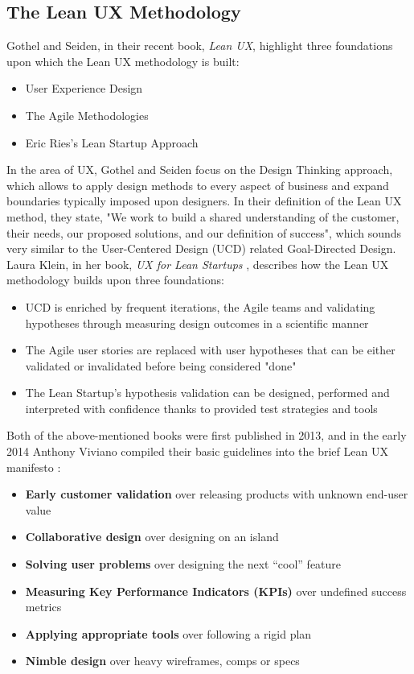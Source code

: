\documentclass{article}
\begin{document}
\subsection{The Lean UX Methodology}
Gothel and Seiden, in their recent book, \textit{Lean UX}, \citep{gothelf2016lean} highlight three foundations upon which the Lean UX methodology is built:
\begin{itemize}
  \item User Experience Design
  \item The Agile Methodologies
  \item Eric Ries's Lean Startup Approach
\end{itemize}
In the area of UX, Gothel and Seiden focus on the Design Thinking approach, which allows to apply design methods to every aspect of business and expand boundaries typically imposed upon designers. In their definition of the Lean UX method, they state, "We work to build a shared understanding of the customer, their needs, our
proposed solutions, and our definition of success", which sounds very similar to the User-Centered Design (UCD) related Goal-Directed Design.
Laura Klein, in her book, \textit{UX for Lean Startups} \citep{klein2013ux}, describes how the Lean UX methodology builds upon three foundations:
\begin{itemize}
  \item UCD is enriched by frequent iterations, the Agile teams and validating hypotheses through measuring design outcomes in a scientific manner
  \item The Agile user stories are replaced with user hypotheses that can be either validated or invalidated before being considered "done"
  \item The Lean Startup's hypothesis validation can be designed, performed and interpreted with confidence thanks to provided test strategies and tools
\end{itemize}
Both of the above-mentioned books were first published in 2013, and in the early 2014 Anthony Viviano compiled their basic guidelines into the brief Lean UX manifesto \citep{viviano2014lean}:
\begin{itemize}
  \item \textbf{Early customer validation} over releasing products with unknown end-user value
  \item \textbf{Collaborative design} over designing on an island
  \item \textbf{Solving user problems} over designing the next “cool” feature
  \item \textbf{Measuring Key Performance Indicators (KPIs)} over undefined success metrics
  \item \textbf{Applying appropriate tools} over following a rigid plan
  \item \textbf{Nimble design} over heavy wireframes, comps or specs
\end{itemize}
\end{document}
